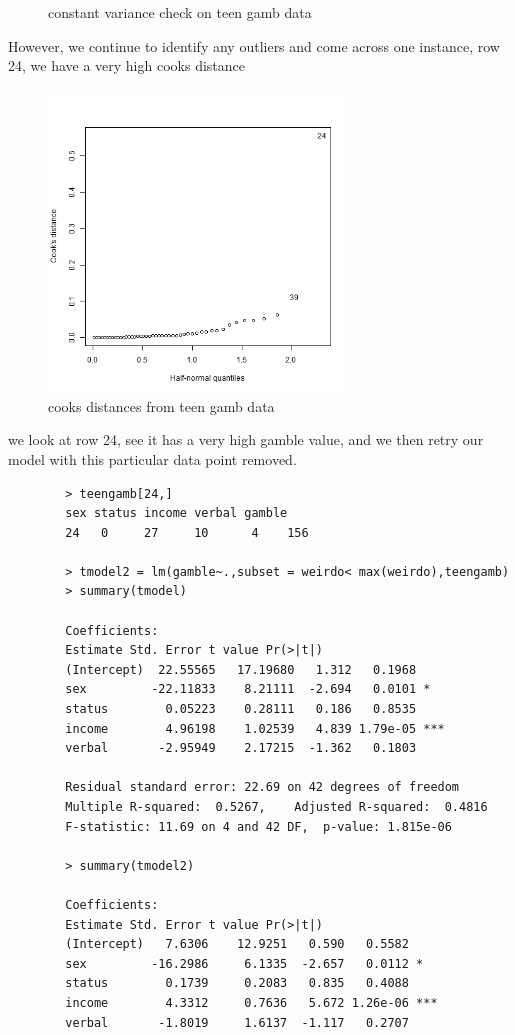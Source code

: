 \documentclass[11pt]{article}
\begin{document}
\begin{enumerate}
\begin{figure}[H]
		\caption[teengambcv]{constant variance check on teen gamb data}
		\label{CV check on teen gamb}
	\end{figure}
	However, we continue to identify any outliers and come across one instance, row 24, we have a very high cooks distance
	\begin{figure}[H]
		\centering
		\includegraphics[width=8cm,height=8cm]{teengambCD.png}
		\caption[teengambCD]{cooks distances from teen gamb data}
		\label{CD check on teen gamb}
	\end{figure}
	we look at row 24, see it has a very high gamble value, and we then retry our model with this particular data point removed.
	\begin{verbatim}
		> teengamb[24,]
		sex status income verbal gamble
		24   0     27     10      4    156
		
		> tmodel2 = lm(gamble~.,subset = weirdo< max(weirdo),teengamb)
		> summary(tmodel)
		
		Coefficients:
		Estimate Std. Error t value Pr(>|t|)    
		(Intercept)  22.55565   17.19680   1.312   0.1968    
		sex         -22.11833    8.21111  -2.694   0.0101 *  
		status        0.05223    0.28111   0.186   0.8535    
		income        4.96198    1.02539   4.839 1.79e-05 ***
		verbal       -2.95949    2.17215  -1.362   0.1803    
		
		Residual standard error: 22.69 on 42 degrees of freedom
		Multiple R-squared:  0.5267,	Adjusted R-squared:  0.4816 
		F-statistic: 11.69 on 4 and 42 DF,  p-value: 1.815e-06
		
		> summary(tmodel2)
		
		Coefficients:
		Estimate Std. Error t value Pr(>|t|)    
		(Intercept)   7.6306    12.9251   0.590   0.5582    
		sex         -16.2986     6.1335  -2.657   0.0112 *  
		status        0.1739     0.2083   0.835   0.4088    
		income        4.3312     0.7636   5.672 1.26e-06 ***
		verbal       -1.8019     1.6137  -1.117   0.2707    
		

\end{verbatim}
\end{enumerate}
\end{document}
